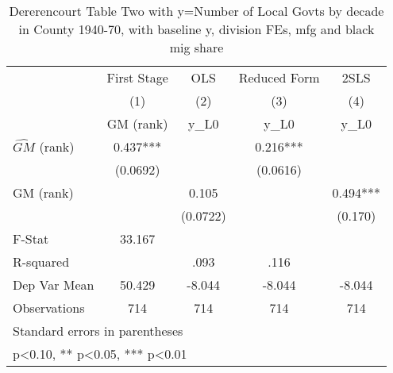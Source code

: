 \begin{table}[htbp]\centering
\def\sym#1{\ifmmode^{#1}\else\(^{#1}\)\fi}
\caption{Dererencourt Table Two with y=Number of Local Govts by decade in County 1940-70, with baseline y, division FEs, mfg and black mig share}
\begin{tabular}{l*{4}{c}}
\toprule
                    & First Stage   &         OLS   &Reduced Form   &        2SLS   \\
                    &\multicolumn{1}{c}{(1)}&\multicolumn{1}{c}{(2)}&\multicolumn{1}{c}{(3)}&\multicolumn{1}{c}{(4)}\\
                    &\multicolumn{1}{c}{GM  (rank)}&\multicolumn{1}{c}{y\_L0}&\multicolumn{1}{c}{y\_L0}&\multicolumn{1}{c}{y\_L0}\\
\midrule
$\hat{GM}$ (rank)   &       0.437***&               &       0.216***&               \\
                    &    (0.0692)   &               &    (0.0616)   &               \\
\addlinespace
GM  (rank)          &               &       0.105   &               &       0.494***\\
                    &               &    (0.0722)   &               &     (0.170)   \\
\midrule
F-Stat              &      33.167   &               &               &               \\
R-squared           &               &        .093   &        .116   &               \\
Dep Var Mean        &      50.429   &      -8.044   &      -8.044   &      -8.044   \\
Observations        &         714   &         714   &         714   &         714   \\
\bottomrule
\multicolumn{5}{l}{\footnotesize Standard errors in parentheses}\\
\multicolumn{5}{l}{\footnotesize * p<0.10, ** p<0.05, *** p<0.01}\\
\end{tabular}
\end{table}
